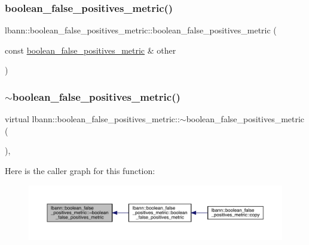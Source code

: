 \subsubsection{\texorpdfstring{boolean\+\_\+false\+\_\+positives\+\_\+metric()}{boolean\_false\_positives\_metric()}\hspace{0.1cm}{\footnotesize\ttfamily [2/2]}}
{\footnotesize\ttfamily lbann\+::boolean\+\_\+false\+\_\+positives\+\_\+metric\+::boolean\+\_\+false\+\_\+positives\+\_\+metric (\begin{DoxyParamCaption}\item[{const \hyperlink{classlbann_1_1boolean__false__positives__metric}{boolean\+\_\+false\+\_\+positives\+\_\+metric} \&}]{other }\end{DoxyParamCaption})\hspace{0.3cm}{\ttfamily [default]}}

\mbox{\label{classlbann_1_1boolean__false__positives__metric_aa52263b9202a358bb1a2a1d5ce96e4b2}} 
\subsubsection{\texorpdfstring{$\sim$boolean\+\_\+false\+\_\+positives\+\_\+metric()}{~boolean\_false\_positives\_metric()}}
{\footnotesize\ttfamily virtual lbann\+::boolean\+\_\+false\+\_\+positives\+\_\+metric\+::$\sim$boolean\+\_\+false\+\_\+positives\+\_\+metric (\begin{DoxyParamCaption}{ }\end{DoxyParamCaption})\hspace{0.3cm}{\ttfamily [virtual]}, {\ttfamily [default]}}

Here is the caller graph for this function\+:\nopagebreak
\begin{figure}[H]
\begin{center}
\leavevmode
\includegraphics[width=350pt]{classlbann_1_1boolean__false__positives__metric_aa52263b9202a358bb1a2a1d5ce96e4b2_icgraph}
\end{center}
\end{figure}



